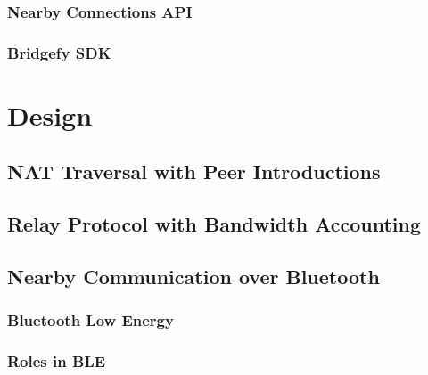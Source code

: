\subsection{Nearby Connections API}

\subsection{Bridgefy SDK}


\chapter{Design}


\section{NAT Traversal with Peer Introductions}




\section{Relay Protocol with Bandwidth Accounting}

\section{Nearby Communication over Bluetooth}

\subsection{Bluetooth Low Energy}

\subsection{Roles in BLE}

